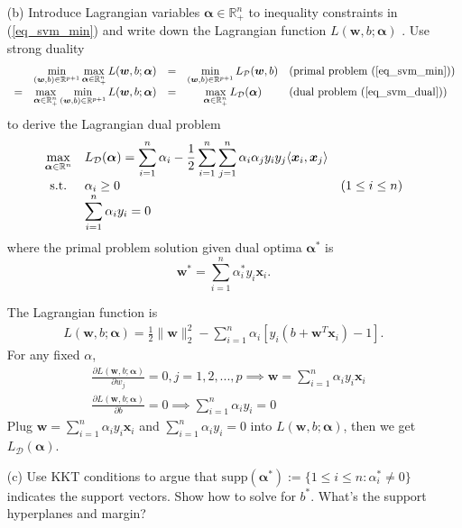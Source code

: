 \documentclass[10pt]{article}
\theoremstyle{definition}
\theoremstyle{remark}
\newcommand{\bw}{\bm{w}}
\newcommand{\bx}{\bm{x}}
\newcommand{\balpha}{\bm{\alpha}}
\newcommand{\bbR}{\mathbb{R}}
\newcommand{\cD}{\mathcal{D}}
\newcommand{\cP}{\mathcal{P}}
\newcommand{\supp}{\mathrm{supp}}	%
\newcommand{\st}{\mathrm{s.t.}}		%
\begin{document}
\begin{enumerate}
\begin{itemize}
		
		\item [(b)] Introduce Lagrangian variables $ \balpha \in \bbR^{n}_{+} $ to inequality constraints in (\ref{eq_svm_min}) and write down the Lagrangian function $ L(\bw,b;\balpha) $ \citep[see][Chapter 5]{boyd2004convex}. Use strong duality
		\[ \begin{array}{ccccl}
		&\min\limits_{(\bw,b) \in \bbR^{p+1}}\max\limits_{\balpha \in \bbR_{+}^{n}}L(\bw,b;\balpha) & = & \min\limits_{(\bw,b) \in \bbR^{p+1}}L_{\cP}(\bw,b) &(\text{primal problem (\ref{eq_svm_min})})
		\\
		=&\max\limits_{\balpha \in \bbR^{n}_{+}}\min\limits_{(\bw,b) \in \bbR^{p+1}}L(\bw,b;\balpha) & = & \max\limits_{\balpha \in \bbR^{n}_{+}}L_{\cD}(\balpha) & (\text{dual problem (\ref{eq_svm_dual})})
		\end{array} \]
		to derive the Lagrangian dual problem
		\begin{align}
		\begin{array}{cll}
		\max\limits_{\balpha \in \bbR^{n}} & \displaystyle L_{\cD}(\balpha) = \sum_{i=1}^{n}\alpha_{i} - {1 \over 2}\sum_{i=1}^{n}\sum_{j=1}^{n}\alpha_{i}\alpha_{j}y_{i}y_{j}\langle \bx_{i},\bx_{j} \rangle \\
		\st & \alpha_{i} \ge 0 & (1 \le i \le n)\\
		& \displaystyle \sum_{i=1}^{n}\alpha_{i}y_{i} = 0
		\end{array}\label{eq_svm_dual}
		\end{align}
		where the primal problem solution given dual optima $ \balpha^{*} $ is
		\[ \bw^{*} = \sum_{i=1}^{n}\alpha_{i}^{*}y_{i}\bx_{i}. \]
		
		The Lagrangian function is
		\begin{align*}
		    L(\bw,b;\balpha) = \frac{1}{2}\|\bw\|_{2}^{2} - \sum_{i=1}^{n}\alpha_i [y_{i}(b + \bw^{T}\bx_{i}) - 1].
		\end{align*}
		For any fixed $\alpha$,
		\begin{align*}
		    & \frac{\partial L(\bw,b;\balpha)}{\partial w_j} = 0, j=1,2,...,p \implies \bw = \sum_{i=1}^{n}\alpha_i y_{i}\bx_i \\
		    & \frac{\partial L(\bw,b;\balpha)}{\partial b} = 0 \implies \sum_{i=1}^{n}\alpha_i y_i = 0
		\end{align*}
		Plug $\bw = \sum_{i=1}^{n}\alpha_i y_{i}\bx_i$ and $ \sum_{i=1}^{n}\alpha_i y_i = 0 $ into $L(\bw,b;\balpha)$, then we get $L_{\cD}(\balpha)$.
		
		\item [(c)] Use KKT conditions to argue that $ \supp(\balpha^{*}) := \{ 1 \le i \le n: \alpha^{*}_{i} \ne 0 \} $ indicates the support vectors. Show how to solve for $ b^{*} $. What's the support hyperplanes and margin?
		

\end{itemize}
\end{enumerate}
\end{document}
